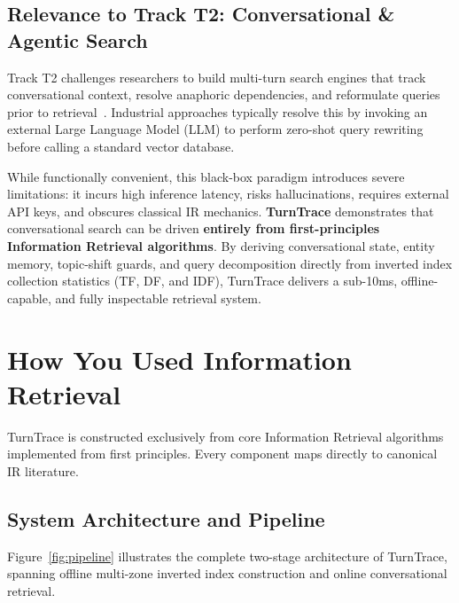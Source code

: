 \documentclass[10pt,a4paper,twocolumn]{article}
\begin{document}
\subsection{Relevance to Track T2: Conversational \& Agentic Search}
Track T2 challenges researchers to build multi-turn search engines that track conversational context, resolve anaphoric dependencies, and reformulate queries prior to retrieval~\cite{dalton2020cast, vakulenko2021question}. Industrial approaches typically resolve this by invoking an external Large Language Model (LLM) to perform zero-shot query rewriting before calling a standard vector database. 

While functionally convenient, this black-box paradigm introduces severe limitations: it incurs high inference latency, risks hallucinations, requires external API keys, and obscures classical IR mechanics. \textbf{TurnTrace} demonstrates that conversational search can be driven \textbf{entirely from first-principles Information Retrieval algorithms}. By deriving conversational state, entity memory, topic-shift guards, and query decomposition directly from inverted index collection statistics (TF, DF, and IDF), TurnTrace delivers a sub-10ms, offline-capable, and fully inspectable retrieval system.

\section{How You Used Information Retrieval}
\label{sec:ir_principles}

TurnTrace is constructed exclusively from core Information Retrieval algorithms implemented from first principles. Every component maps directly to canonical IR literature.

\subsection{System Architecture and Pipeline}
Figure~\ref{fig:pipeline} illustrates the complete two-stage architecture of TurnTrace, spanning offline multi-zone inverted index construction and online conversational retrieval.
\end{document}
